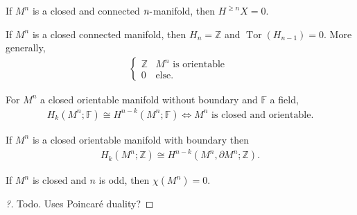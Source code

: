 \begin{proposition}

If \(M^n\) is a closed and connected \(n{\hbox{-}}\)manifold, then
\(H^{\geq n} X = 0\).

\end{proposition}

\begin{proposition}

If \(M^n\) is a closed connected manifold, then \(H_n = {\mathbb{Z}}\)
and \(\operatorname{Tor}(H_{n-1}) = 0\). More generally,
\begin{align*}
\begin{cases}
{\mathbb{Z}}& M^n \text{ is orientable } 
\\
0 & \text{else}.
\end{cases}
\end{align*}

\end{proposition}

\begin{proposition}

For \(M^n\) a closed orientable manifold without boundary and
\({\mathbb{F}}\) a field,
\begin{align*}
H_k(M^n; {\mathbb{F}}) \cong H^{n-k}(M^n; {\mathbb{F}})
\iff
M^n \text{ is closed and orientable}
.\end{align*}

\end{proposition}

\begin{proposition}

If \(M^n\) is a closed orientable manifold with boundary then
\begin{align*}
H_k(M^n; {\mathbb{Z}}) \cong H^{n-k}(M^n, {\partial}M^n; {\mathbb{Z}})
.\end{align*}

\end{proposition}

\begin{proposition}

If \(M^n\) is closed and \(n\) is odd, then \(\chi(M^n) = 0\).

\end{proposition}

\begin{proof}[?]

Todo. Uses Poincaré duality?

\end{proof}

